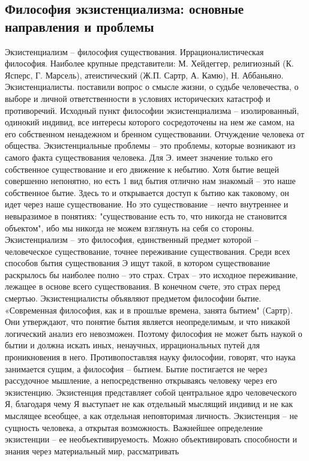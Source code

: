 \documentclass[12pt]{article}
\begin{document}
\subsection{Философия экзистенциализма: основные направления и проблемы}
Экзистенциализм – философия существования. Иррационалистическая философия.
Наиболее крупные представители: М. Хейдеггер, религиозный (К. Ясперс, Г. Марсель), атеистический (Ж.П. 
Сартр, А. Камю), Н. Аббаньяно.
Экзистенциалисты. поставили вопрос о смысле жизни, о судьбе человечества, о выборе и личной
ответственности в условиях исторических катастроф и противоречий.
Исходный пункт философии экзистенциализма – изолированный, одинокий индивид, все интересы которого
сосредоточены на нем же самом, на его собственном ненадежном и бренном существовании. Отчуждение
человека от общества.
Экзистенциальные проблемы – это проблемы, которые возникают из самого факта существования человека. Для
Э. имеет значение только его собственное существование и его движение к небытию.
Хотя бытие вещей совершенно непонятно, но есть 1 вид бытия отлично нам знакомый – это наше собственное
бытие. Здесь то и открывается доступ к бытию как таковому, он идет через наше существование. Но это
существование – нечто внутреннее и невыразимое в понятиях: "существование есть то, что никогда не
становится объектом", ибо мы никогда не можем взглянуть на себя со стороны.
Экзистенциализм – это философия, единственный предмет которой – человеческое существование, точнее
переживание существования. Среди всех способов бытия существования Э ищут такой, в котором
существование раскрылось бы наиболее полно – это страх. Страх – это исходное переживание, лежащее в
основе всего существования. В конечном счете, это страх перед смертью.
Экзистенциалисты объявляют предметом философии бытие. «Современная философия, как и в прошлые
времена, занята бытием" (Сартр). Они утверждают, что понятие бытия является неопределимым, и что никакой
логический анализ его невозможен. Поэтому философия не может быть наукой о бытии и должна искать иных,
ненаучных, иррациональных путей для проникновения в него. Противопоставляя науку философии, говорят, что
наука занимается сущим, а философия – бытием. Бытие постигается не через рассудочное мышление, а
непосредственно открываясь человеку через его экзистенцию.
Экзистенция представляет собой центральное ядро человеческого Я, благодаря чему Я выступает не как
отдельный мыслящий индивид и не как мыслящее всеобщее, а как отдельная неповторимая личность.
Экзистенция – не сущность человека, а открытая возможность. Важнейшее определение экзистенции – ее
необъективируемость. Можно объективировать способности и знания через материальный мир, рассматривать
\end{document}
